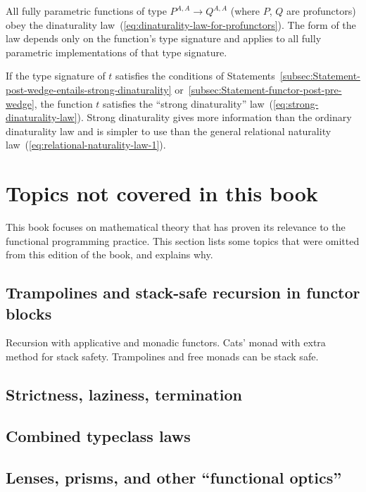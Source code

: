 All fully parametric functions of type $P^{A,A}\rightarrow Q^{A,A}$
(where $P$, $Q$ are profunctors) obey the dinaturality law~(\ref{eq:dinaturality-law-for-profunctors}).
The form of the law depends only on the function\textsf{'}s type signature
and applies to all fully parametric implementations of that type signature.

If the type signature of $t$ satisfies the conditions of Statements~\ref{subsec:Statement-post-wedge-entails-strong-dinaturality}
or~\ref{subsec:Statement-functor-post-pre-wedge}, the function $t$
satisfies the \textsf{``}strong dinaturality\textsf{''} law~(\ref{eq:strong-dinaturality-law}).
Strong dinaturality gives more information than the ordinary dinaturality
law and is simpler to use than the general relational naturality law~(\ref{eq:relational-naturality-law-1}).

\setcounter{secnumdepth}{3}%
\begin{comment}
Restore the normal numbering of subsections and subsubsections
\end{comment}


\section{Topics not covered in this book}

This book focuses on mathematical theory that has proven its relevance
to the functional programming practice. This section lists some topics
that were omitted from this edition of the book, and explains why.

\subsection{Trampolines and stack-safe recursion in functor blocks}

Recursion with applicative and monadic functors. Cats\textsf{'} monad with
extra method for stack safety. Trampolines and free monads can be
stack safe.

\subsection{Strictness, laziness, termination}

\subsection{Combined typeclass laws}

\subsection{Lenses, prisms, and other \textquotedblleft functional optics\textquotedblright}

